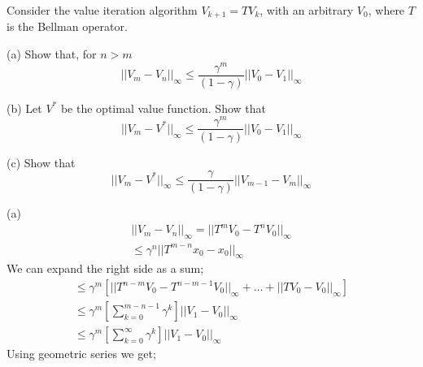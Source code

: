 \documentclass{article}
\begin{document}
\begin{tcolorbox}[colback=blue!5!white,colframe=blue!75!black,title=Question 6]
    Consider the value iteration algorithm $V_{k+1} = TV_k$, with an arbitrary $V_0$, where $T$ is the Bellman operator.
    \begin{enumerate}(a) Show that, for $n > m$
        \begin{equation}
            ||V_m - V_n||_\infty \leq \frac{\gamma^m}{(1-\gamma)}||V_0 - V_1||_\infty
        \end{equation}
    \end{enumerate}
    \begin{enumerate}(b) Let $V^*$ be the optimal value function. Show that
        \begin{equation}
            ||V_m - V^*||_\infty \leq \frac{\gamma^m}{(1-\gamma)}||V_0 - V_1||_\infty
        \end{equation}
    \end{enumerate}
    \begin{enumerate}(c) Show that
        \begin{equation}
            ||V_m - V^*||_\infty \leq \frac{\gamma}{(1-\gamma)}||V_{m-1} - V_m||_\infty
        \end{equation}
    \end{enumerate}
    \tcblower
    \begin{enumerate}(a) 
        \begin{equation}
            \begin{split}
                ||V_m - V_n||_\infty = || T^m V_0 - T^n V_0 ||_\infty\\
                \leq \gamma^n || T^{m-n} x_0- x_0 ||_\infty
            \end{split}
        \end{equation}
        We can expand the right side as a sum;
        \begin{equation}
            \begin{align*}
                \leq \gamma^m [ ||T^{n-m} V_0-T^{n-m-1} V_0||_\infty +\dots + ||T V_0-V_0||_\infty]\\
                 \leq \gamma^m [ \sum\limits_{k=0}^{m-n-1} \gamma^k ] || V_1 - V_0 ||_\infty\\
                 \leq \gamma^m [ \sum\limits_{k=0}^{\infty} \gamma^k ] || V_1 - V_0 ||_\infty
            \end{align*}
        \end{equation}
        Using geometric series we get;
        \begin{equation}

\end{equation}
\end{enumerate}
\end{tcolorbox}
\end{document}
